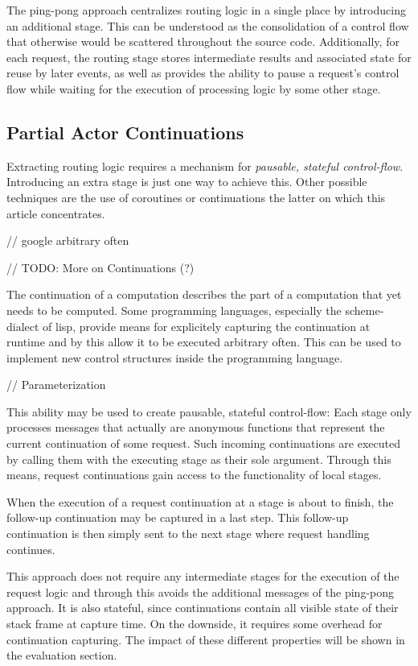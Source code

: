 \documentclass{sig-alternate}
\begin{document}
The ping-pong approach centralizes routing logic in a single place by introducing an additional
stage. This can be understood as the consolidation of a control flow that otherwise would be
scattered throughout the source code. Additionally, for each request, the routing stage stores
intermediate results and associated state for reuse by later events, as well as provides the ability
to pause a request's control flow while waiting for the execution of processing logic by some other
stage.



\subsection{Partial Actor Continuations}

Extracting routing logic requires a mechanism for \emph{pausable, stateful control-flow}.
Introducing an extra stage is just one way to achieve this. Other possible techniques are the use of
coroutines or continuations the latter on which this article concentrates.
          

// google arbitrary often

// TODO: More on Continuations (?)

The continuation of a computation describes the part of a computation that yet needs to be computed.
Some programming languages, especially the scheme-dialect of lisp, provide means for explicitely
capturing the continuation at runtime and by this allow it to be executed arbitrary often.  This
can be used to implement new control structures inside the programming language.  

                                
// Parameterization

This ability may be used to create pausable, stateful control-flow: Each stage only processes
messages that actually are anonymous functions that represent the current continuation of some
request. Such incoming continuations are executed by calling them with the executing stage as their
sole argument. Through this means, request continuations gain access to the functionality of local
stages.

When the execution of a request continuation at a stage is about to finish, the follow-up 
continuation may be captured in a last step.  This follow-up continuation is then simply sent
to the next stage where request handling continues.  

This approach does not require any intermediate stages for the execution of the request logic and
through this avoids the additional messages of the ping-pong approach. It is also stateful, since
continuations contain all visible state of their stack frame at capture time. On the downside, it
requires some overhead for continuation capturing. The impact of these different properties will be
shown in the evaluation section.
\end{document}
